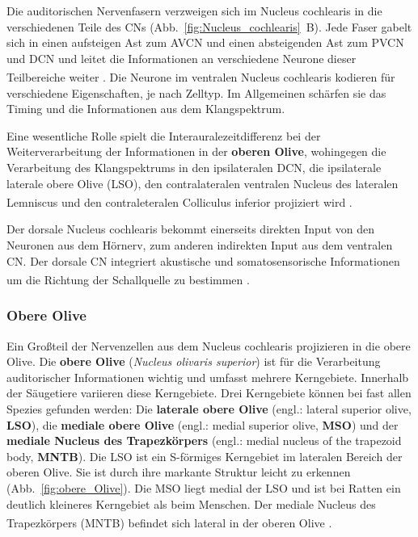 \noindent Die auditorischen Nervenfasern verzweigen sich im Nucleus cochlearis in die verschiedenen Teile des CNs (Abb.~\ref{fig:Nucleus_cochlearis}~B). Jede Faser gabelt sich in einen aufsteigen Ast zum AVCN und einen absteigenden Ast zum PVCN und DCN und leitet die Informationen an verschiedene Neurone dieser Teilbereiche weiter \textsuperscript{\cite[Kap.~22]{paxinos2014rat}}. Die Neurone im ventralen Nucleus cochlearis kodieren für verschiedene Eigenschaften, je nach Zelltyp. Im Allgemeinen schärfen sie das Timing und die Informationen aus dem Klangspektrum. 

\noindent Eine wesentliche Rolle spielt die Interauralezeitdifferenz bei der Weiterverarbeitung der Informationen in der  \textbf{oberen Olive}, wohingegen die Verarbeitung des Klangspektrums in den ipsilateralen DCN, die ipsilaterale laterale obere Olive (LSO), den contralateralen ventralen Nucleus des lateralen Lemniscus und den contraleteralen Colliculus inferior projiziert wird \textsuperscript{\cite[Kap.~31]{kandel2013principles}}. 

\noindent Der dorsale Nucleus cochlearis bekommt einerseits direkten Input von den Neuronen aus dem Hörnerv, zum anderen indirekten Input aus dem ventralen CN. Der dorsale CN integriert akustische und somatosensorische Informationen um die Richtung der Schallquelle zu bestimmen \textsuperscript{\cite[Kap.~31]{kandel2013principles}}. 


\subsubsection*{Obere Olive}
Ein Großteil der Nervenzellen aus dem Nucleus cochlearis projizieren in die obere Olive. Die \textbf{obere Olive} (\textit{Nucleus olivaris superior}) ist für die Verarbeitung auditorischer Informationen wichtig und umfasst mehrere Kerngebiete. Innerhalb der Säugetiere variieren diese Kerngebiete. Drei Kerngebiete können bei fast allen Spezies gefunden werden: Die \textbf{laterale obere Olive} (engl.: lateral superior olive, \textbf{LSO}), die \textbf{mediale obere Olive} (engl.: medial superior olive, \textbf{MSO}) und der \textbf{mediale Nucleus des Trapezkörpers} (engl.: medial nucleus of the trapezoid body, \textbf{MNTB}). Die LSO ist ein S-förmiges Kerngebiet im lateralen Bereich der oberen Olive. Sie ist durch ihre markante Struktur leicht zu erkennen (Abb.~\ref{fig:obere_Olive}). Die MSO liegt medial der LSO und ist bei Ratten ein deutlich kleineres Kerngebiet als beim Menschen. Der mediale Nucleus des Trapezkörpers (MNTB) befindet sich lateral in der oberen Olive \textsuperscript{\cite[Kap.~29]{paxinos2014rat}}.

